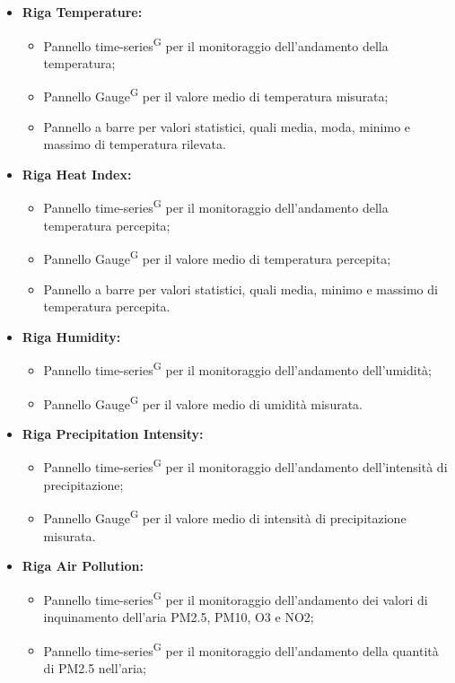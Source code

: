 \documentclass[8pt]{article}
\newcommand{\glossterm}[1]{#1\textsuperscript{G}} %
\begin{document}
\begin{itemize}
    \item \textbf{Riga Temperature:}
    \begin{itemize}
        \item Pannello \glossterm{time-series} per il monitoraggio dell'andamento della temperatura;
        \item Pannello \glossterm{Gauge} per il valore medio di temperatura misurata;
        \item Pannello a barre per valori statistici, quali media, moda, minimo e massimo di temperatura rilevata.
    \end{itemize}
    \item \textbf{Riga Heat Index:}
    \begin{itemize}
        \item Pannello \glossterm{time-series} per il monitoraggio dell'andamento della temperatura percepita;
        \item Pannello \glossterm{Gauge} per il valore medio di temperatura percepita;
        \item Pannello a barre per valori statistici, quali media, minimo e massimo di temperatura percepita.
    \end{itemize}
    \item \textbf{Riga Humidity:}
    \begin{itemize}
        \item Pannello \glossterm{time-series} per il monitoraggio dell'andamento dell'umidità;
        \item Pannello \glossterm{Gauge} per il valore medio di umidità misurata.
    \end{itemize}
    \item \textbf{Riga Precipitation Intensity:}
    \begin{itemize}
        \item Pannello \glossterm{time-series} per il monitoraggio dell'andamento dell'intensità di precipitazione;
        \item Pannello \glossterm{Gauge} per il valore medio di intensità di precipitazione misurata.
    \end{itemize}
    \item \textbf{Riga Air Pollution:}
    \begin{itemize}
        \item Pannello \glossterm{time-series} per il monitoraggio dell'andamento dei valori di inquinamento dell'aria PM2.5, PM10, O3 e NO2;
        \item Pannello \glossterm{time-series} per il monitoraggio dell'andamento della quantità di PM2.5 nell'aria;

\end{itemize}
\end{itemize}
\end{document}
